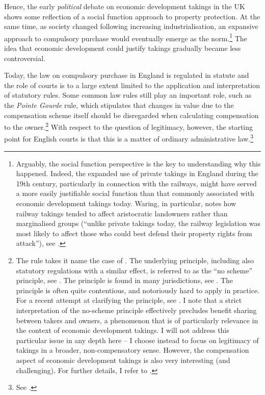 Hence, the early {\it political} debate on economic development takings in the UK shows some reflection of a social function approach to property protection. At the same time, as society changed following increasing industrialisation, an expansive approach to compulsory purchase would eventually emerge as the norm.\footnote{Arguably, the social function perspective is the key to understanding why this happened. Indeed, the expanded use of private takings in England during the 19th century, particularly in connection with the railways, might have served a more easily justifiable social function than that commonly associated with economic development takings today. Waring, in particular, notes how railway takings tended to affect aristocratic landowners rather than marginalised groups (``unlike private takings today, the railway legislation was most likely to affect those who could best defend their property rights from attack''), see \cite[111]{waring09}.} The idea that economic development could justify takings gradually became less controversial.

Today, the law on compulsory purchase in England is regulated in statute and the role of courts is to a large extent limited to the application and interpretation of statutory rules. Some common law rules still play an important role, such as the {\it Pointe Gourde} rule, which stipulates that changes in value due to the compensation scheme itself should be disregarded when calculating compensation to the owner.\footnote{The rule takes it name the case of \cite{gourde47}. The underlying principle, including also statutory regulations with a similar effect, is referred to as the ``no scheme'' principle, see \cite{lawcom01}. The principle is found in many jurisdictions, see \cite{sluysmans14}. The principle is often quite contentious, and notoriously hard to apply in practice. For a recent attempt at clarifying the principle, see \cite{waters04}. I note that a strict interpretation of the no-scheme principle effectively precludes benefit sharing between takers and owners, a phenomenon that is of particularly relevance in the context of economic development takings. I will not address this particular issue in any depth here -- I choose instead to focus on legitimacy of takings in a broader, non-compensatory sense. However, the compensation aspect of economic development takings is also very interesting (and challenging). For further details, I refer to \cite{dyrkolbotn15}.} With respect to the question of legitimacy, however, the starting point for English courts is that this is a matter of ordinary administrative law.\footnote{See \cite{taggart98}.}


